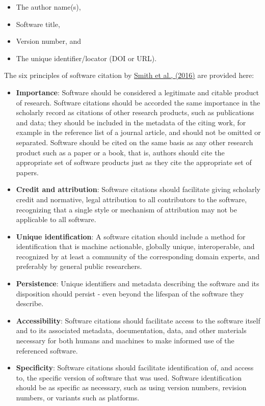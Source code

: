 \documentclass[]{book}
\providecommand{\tightlist}{%
  \setlength{\itemsep}{0pt}\setlength{\parskip}{0pt}}
\begin{document}
\begin{itemize}
\tightlist
\item
  The author name(s),
\item
  Software title,
\item
  Version number, and
\item
  The unique identifier/locator (DOI or URL).
\end{itemize}

The six principles of software citation by \href{https://github.com/OpenScienceMOOC/Module-5-Open-Research-Software-and-Open-Source/blob/master/Reading\%20Material_Open\%20Source\%20and\%20Open\%20Research\%20Software/Smith\%20et\%20al.\%2C\%202016.pdf}{Smith et al., (2016)} are provided here:

\begin{itemize}
\item
  \textbf{Importance}: Software should be considered a legitimate and citable product of research. Software citations should be accorded the same importance in the scholarly record as citations of other research products, such as publications and data; they should be included in the metadata of the citing work, for example in the reference list of a journal article, and should not be omitted or separated. Software should be cited on the same basis as any other research product such as a paper or a book, that is, authors should cite the appropriate set of software products just as they cite the appropriate set of papers.
\item
  \textbf{Credit and attribution}: Software citations should facilitate giving scholarly credit and normative, legal attribution to all contributors to the software, recognizing that a single style or mechanism of attribution may not be applicable to all software.
\item
  \textbf{Unique identification}: A software citation should include a method for identification that is machine actionable, globally unique, interoperable, and recognized by at least a community of the corresponding domain experts, and preferably by general public researchers.
\item
  \textbf{Persistence}: Unique identifiers and metadata describing the software and its disposition should persist - even beyond the lifespan of the software they describe.
\item
  \textbf{Accessibility}: Software citations should facilitate access to the software itself and to its associated metadata, documentation, data, and other materials necessary for both humans and machines to make informed use of the referenced software.
\item
  \textbf{Specificity}: Software citations should facilitate identification of, and access to, the specific version of software that was used. Software identification should be as specific as necessary, such as using version numbers, revision numbers, or variants such as platforms.
\end{itemize}
\end{document}
